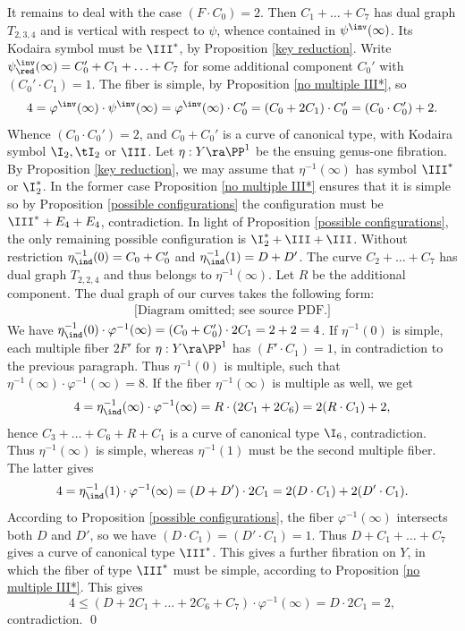 It remains to deal with the case $(F\cdot C_0)=2$. Then $C_1+\ldots+C_7$ has dual graph $T_{2,3,4}$ and is vertical with respect to $\psi$,
whence contained in $\psi^\inv(\infty)$. Its Kodaira symbol must be $\III^*$, by Proposition \ref{key reduction}.
Write $\psi^\inv_\red(\infty)=C_0'+C_1+\ldots+C_7$ for some additional component $C_0'$ with $(C_0'\cdot C_1)=1$.
The fiber is simple, by Proposition \ref{no multiple III*}, so
$$
4=\varphi^\inv(\infty)\cdot \psi^\inv(\infty) = \varphi^\inv(\infty)\cdot C_0' = (C_0+ 2C_1)\cdot C_0' = (C_0\cdot C_0') +2.
$$
Whence $(C_0\cdot C_0')=2$, and $C_0+C_0'$ is a curve of canonical type, with Kodaira symbol $\I_2,\tI_2$ or $\III$.
Let $\eta:Y\ra\PP^1$ be the
ensuing genus-one fibration. By Proposition \ref{key reduction}, we may assume that $\eta^{-1}(\infty)$ has
symbol $\III^*$ or $\I_2^*$. In the former case Proposition \ref{no multiple III*} ensures that it is simple
so by  Proposition \ref{possible configurations} the configuration must be $\III^*+E_4+E_4$, contradiction.
In light of Proposition \ref{possible configurations}, the only remaining possible configuration is $\I_2^*+\III+\III$.
Without restriction $\eta_\ind^{-1}(0)=C_0+C_0'$ and $\eta_\ind^{-1}(1)=D+D'$.
The curve  $C_2+\ldots+C_7$ has dual graph $T_{2,2,4}$ and thus belongs to $\eta^{-1}(\infty)$.
Let $R$ be the additional component.  The dual graph  of  our curves takes the following form:
\begin{equation*}
\begin{gathered}
\text{[Diagram omitted; see source PDF.]}
\end{gathered}
\end{equation*}
We have
$\eta^{-1}_\ind(0)\cdot \varphi^{-1}(\infty) = (C_0+C_0')\cdot 2C_1 =   2+2=4$.
If $\eta^{-1}(0)$ is simple, each multiple fiber $2F'$ for $\eta:Y\ra\PP^1$ has $(F'\cdot C_1) =1$, in contradiction to the previous
paragraph. Thus $\eta^{-1}(0)$ is multiple, such that  $\eta^{-1}(\infty)\cdot\varphi^{-1}(\infty)= 8$.
If the fiber $\eta^{-1}(\infty)$ is multiple as well, we  get
$$
4=\eta_\ind^{-1}(\infty) \cdot \varphi^{-1}(\infty) = R\cdot (2C_1+2C_6) = 2(R\cdot C_1) + 2,
$$
hence $C_3+\ldots+C_6+R+C_1$ is a curve of canonical type $\I_6$, contradiction.
Thus $\eta^{-1}(\infty)$ is simple, whereas $\eta^{-1}(1)$ must be the second multiple fiber. The latter gives
$$
4=\eta^{-1}_\ind(1)\cdot\varphi^{-1}(\infty) = (D+D')\cdot 2C_1 = 2(D\cdot C_1)+2(D'\cdot C_1).
$$
According to Proposition \ref{possible configurations}, the fiber $\varphi^{-1}(\infty)$ intersects both $D$ and $D'$,
so we have  $(D\cdot C_1)=(D'\cdot C_1)=1$.
Thus $D+C_1+\ldots+C_7$ gives a curve of canonical type $\III^*$. This gives a further fibration on $Y$, in which
  the   fiber of type $\III^*$  must be simple, according to Proposition \ref{no multiple III*}. This gives
$$
4\leq (D+2C_1+\ldots+2C_6+C_7)\cdot\varphi^{-1}(\infty)=D\cdot 2C_1=2,
$$
contradiction.
\qed


